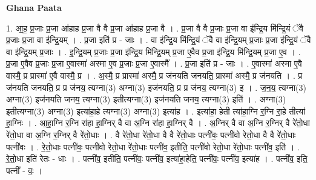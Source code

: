 \documentclass[17pt]{extarticle}
\begin{document}
\textbf{Ghana Paata } \newline

1. आ॒ह॒ प्र॒जाः प्र॒जा आ॑हाह प्र॒जा वै वै प्र॒जा आ॑हाह प्र॒जा वै । . प्र॒जा वै वै प्र॒जाः प्र॒जा वा इ॑न्द्रि॒य मि॑न्द्रि॒यं ॅवै प्र॒जाः प्र॒जा वा इ॑न्द्रि॒यम् । . प्र॒जा इति॑ प्र - जाः । . वा इ॑न्द्रि॒य मि॑न्द्रि॒यं ॅवै वा इ॑न्द्रि॒यम् प्र॒जाः प्र॒जा इ॑न्द्रि॒यं ॅवै वा इ॑न्द्रि॒यम् प्र॒जाः । . इ॒न्द्रि॒यम् प्र॒जाः प्र॒जा इ॑न्द्रि॒य मि॑न्द्रि॒यम् प्र॒जा ए॒वैव प्र॒जा इ॑न्द्रि॒य मि॑न्द्रि॒यम् प्र॒जा ए॒व । . प्र॒जा ए॒वैव प्र॒जाः प्र॒जा ए॒वास्मा॑ अस्मा ए॒व प्र॒जाः प्र॒जा ए॒वास्मै᳚ । . प्र॒जा इति॑ प्र - जाः । . ए॒वास्मा॑ अस्मा ए॒वै वास्मै॒ प्र प्रास्मा॑ ए॒वै वास्मै॒ प्र । . अ॒स्मै॒ प्र प्रास्मा॑ अस्मै॒ प्र ज॑नयति जनयति॒ प्रास्मा॑ अस्मै॒ प्र ज॑नयति । . प्र ज॑नयति जनयति॒ प्र प्र ज॑नय॒ त्यग्ना(3) अग्ना(3) इज॑नयति॒ प्र प्र ज॑नय॒ त्यग्ना(3) इ । . ज॒न॒य॒ त्यग्ना(3) अग्ना(3) इज॑नयति जनय॒ त्यग्ना(3) इतीत्यग्ना(3) इज॑नयति जनय॒ त्यग्ना(3) इति॑ । . अग्ना(3) इतीत्यग्ना(3) अग्ना(3) इत्या॑हा॒हे त्यग्ना(3) अग्ना(3) इत्या॑ह । . इत्या॑हा॒ हेती त्या॑हा॒ग्नि र॒ग्नि रा॒हे तीत्या॑ हा॒ग्निः । . आ॒हा॒ग्नि र॒ग्नि रा॑हा हा॒ग्निर् वै वा अ॒ग्नि रा॑हा हा॒ग्निर् वै । . अ॒ग्निर् वै वा अ॒ग्नि र॒ग्निर् वै रे॑तो॒धा रे॑तो॒धा वा अ॒ग्नि र॒ग्निर् वै रे॑तो॒धाः । . वै रे॑तो॒धा रे॑तो॒धा वै वै रे॑तो॒धाः पत्नी॑वः॒ पत्नी॑वो रेतो॒धा वै वै रे॑तो॒धाः पत्नी॑वः । . रे॒तो॒धाः पत्नी॑वः॒ पत्नी॑वो रेतो॒धा रे॑तो॒धाः पत्नी॑व॒ इतीति॒ पत्नी॑वो रेतो॒धा रे॑तो॒धाः पत्नी॑व॒ इति॑ । . रे॒तो॒धा इति॑ रेतः - धाः । . पत्नी॑व॒ इतीति॒ पत्नी॑वः॒ पत्नी॑व॒ इत्या॑हा॒हेति॒ पत्नी॑वः॒ पत्नी॑व॒ इत्या॑ह । . पत्नी॑व॒ इति॒ पत्नी᳚ - वः॒ । \newline
\end{document}
